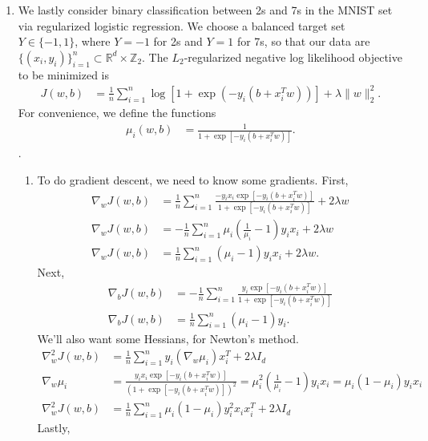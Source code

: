 \documentclass[11pt,letterpaper]{article}
\numberwithin{equation}{section}
\numberwithin{figure}{section}
\begin{document}
\begin{enumerate}
	\item We lastly consider binary classification between 2s and 7s in the MNIST set via regularized logistic regression. We choose a balanced target set $Y \in \{-1,1\}$, where $Y=-1$ for 2s and $Y = 1$ for 7s, so that our data are $\{(x_i,y_i)\}_{i=1}^n \subset \mathbb{R}^d \times \mathbb{Z}_2$. The $L_2$-regularized negative log likelihood objective to be minimized is
	\begin{align*}
		J(w,b) &= \frac{1}{n} \sum_{i=1}^n \log\left[1 + \exp\left(-y_i(b+x_i^T w)\right)\right] + \lambda \|w\|_2^2.
	\end{align*}
	For convenience, we define the functions
	\begin{align*}
		\mu_i(w,b) &= \frac{1}{1+\exp\left[-y_i(b+x_i^T w)\right]}.
	\end{align*}.
	\begin{enumerate}
		\item To do gradient descent, we need to know some gradients. First,
		\begin{align*}
			\nabla_w J(w,b) &= \frac{1}{n} \sum_{i=1}^n \frac{-y_i x_i \exp\left[-y_i(b + x_i^T w)\right]}{1 + \exp\left[-y_i(b+x_i^T w)\right]} + 2\lambda w\\
			\nabla_w J(w,b) &= -\frac{1}{n} \sum_{i=1}^n \mu_i \left(\frac{1}{\mu_i} - 1\right) y_i x_i + 2\lambda w\\
			\nabla_w J(w,b) &= \frac{1}{n} \sum_{i=1}^n (\mu_i - 1) y_i x_i + 2\lambda w.
		\end{align*}
		Next,
		\begin{align*}
			\nabla_b J(w,b) &= -\frac{1}{n} \sum_{i=1}^n \frac{y_i \exp\left[-y_i(b + x_i^T w)\right]}{1+\exp\left[-y_i(b+x_i^T w)\right]}\\
			\nabla_b J(w,b) &= \frac{1}{n} \sum_{i=1}^n (\mu_i -1) y_i.
		\end{align*}
		We'll also want some Hessians, for Newton's method.
		\begin{align*}
			\nabla^2_w J(w,b) &= \frac{1}{n} \sum_{i=1}^n y_i (\nabla_w \mu_i) x_i^T + 2\lambda I_d\\
			\nabla_w \mu_i &= \frac{y_i x_i \exp\left[-y_i(b+x_i^T w)\right]}{\left(1+\exp\left[-y_i(b+x_i^T w)\right]\right)^2} = \mu_i^2 \left(\frac{1}{\mu_i} - 1\right) y_i x_i = \mu_i (1- \mu_i) y_i x_i\\
			\nabla^2_w J(w,b) &= \frac{1}{n} \sum_{i=1}^n \mu_i (1-\mu_i) y_i^2 x_i x_i^T + 2 \lambda I_d
		\end{align*}
		Lastly,
		\begin{align*}

\end{align*}
\end{enumerate}
\end{enumerate}
\end{document}
